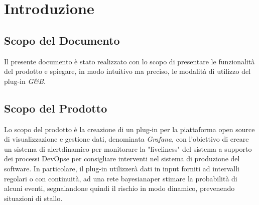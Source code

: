 \section{Introduzione}\label{Intro}

\subsection{Scopo del Documento}
Il presente documento è stato realizzato con lo scopo di presentare le funzionalità del prodotto e spiegare, in modo intuitivo ma preciso, le modalità di utilizzo del plug-in \textit{G\&B}.

\subsection{Scopo del Prodotto}\label{ScopoProdotto}
Lo scopo del prodotto è la creazione di un plug-in per la piattaforma open source di visualizzazione e gestione dati, denominata \textit{Grafana}\glossario, con l'obiettivo di creare un sistema di alert\glossario dinamico per monitorare la "liveliness\glossario" del sistema a supporto dei processi DevOps\glossario e per consigliare interventi nel sistema di produzione del software. In particolare, il plug-in utilizzerà dati in input forniti ad intervalli regolari o con continuità, ad una rete bayesiana\glossario per stimare la probabilità di alcuni eventi, segnalandone quindi il rischio in modo dinamico, prevenendo situazioni di stallo.

